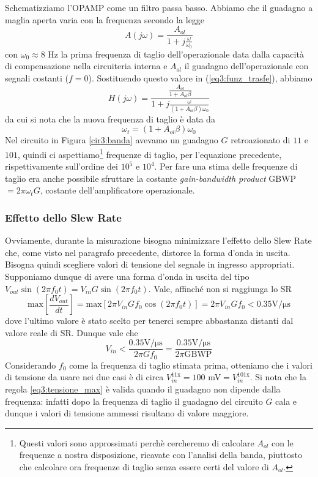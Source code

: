 Schematizziamo l'OPAMP come un filtro passa basso. Abbiamo che il guadagno a maglia aperta varia con la frequenza secondo la legge
$$A(j\omega)=\frac{A_{ol}}{1+j\frac{\omega}{\omega_0}}$$
con $\omega_0 \approx 8$ \si{\hertz} la prima frequenza di taglio dell'operazionale data dalla capacità di compensazione nella circuiteria interna e $A_{ol}$ il guadagno dell'operazionale con segnali costanti ($f = 0$). Sostituendo questo valore in (\ref{eq3:funz_trasfe}), abbiamo
\begin{equation}
H(j\omega)=\frac{\frac{A_{ol}}{1+A_{ol}\beta}}{1+j \frac{\omega}{(1+A_{ol}\beta)\omega_0}}
\label{eq3:funzione_trasferimento}
\end{equation}
da cui si nota che la nuova frequenza di taglio è data da
\begin{equation}
\omega_t=(1+A_{ol}\beta)\omega_0
\label{eq3:freq_taglio}
\end{equation}
Nel circuito in Figura \ref{cir3:banda} avevamo un guadagno $G$ retroazionato di $11$ e $101$, quindi ci aspettiamo\footnote{Questi valori sono approssimati perchè cercheremo di calcolare $A_{ol}$ con le frequenze a nostra disposizione, ricavate con l'analisi della banda, piuttosto che calcolare ora frequenze di taglio senza essere certi del valore di $A_{ol}$.} frequenze di taglio, per l'equazione precedente, rispettivamente sull'ordine dei $10^5$ e $10^4$. Per fare una stima delle frequenze di taglio era anche possibile sfruttare la costante \textit{gain-bandwidth product} GBWP $= 2 \pi \omega_t G$, costante dell'amplificatore operazionale.

\subsubsection*{Effetto dello Slew Rate}

Ovviamente, durante la misurazione bisogna minimizzare l'effetto dello Slew Rate che, come visto nel paragrafo precedente, distorce la forma d'onda in uscita. Bisogna quindi scegliere valori di tensione del segnale in ingresso appropriati.
Supponiamo dunque di avere una forma d'onda in uscita del tipo $V_{out} \sin (2 \pi f_0 t) = V_{in} G \sin (2 \pi f_0 t)$. Vale, affinché non si raggiunga lo SR
$$\mathrm{max}\left[ \frac{dV_{out}}{dt} \right] = \mathrm{max} \left[ 2 \pi V_{in} G f_0 \cos (2 \pi f_0 t) \right]= 2 \pi V_{in} G f_0 < 0.35 \si{\volt\per\micro\second}$$
dove l'ultimo valore è stato scelto per tenerci sempre abbastanza distanti dal valore reale di SR. Dunque vale che
\begin{equation}
V_{in}<\frac{0.35 \si{\volt\per\micro\second}}{2 \pi G f_0} = \frac{0.35 \si{\volt\per\micro\second}}{2 \pi \mathrm{GBWP}}
\label{eq3:tensione_max}
\end{equation}
Considerando $f_0$ come la frequenza di taglio stimata prima, otteniamo che i valori di tensione da usare nei due casi è di circa $V_{in}^{11\mathrm{x}} = 100$ \si{\milli\volt}$= V_{in}^{101\mathrm{x}}$. Si nota che la regola \ref{eq3:tensione_max} è valida quando il guadagno non dipende dalla frequenza: infatti dopo la frequenza di taglio il guadagno del circuito $G$ cala e dunque i valori di tensione ammessi risultano di valore maggiore.

